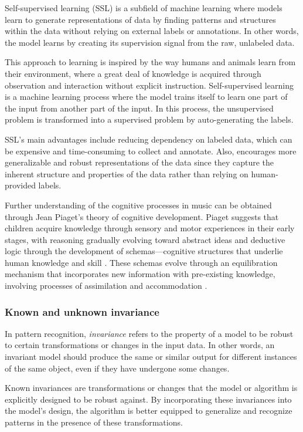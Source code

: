 Self-supervised learning (SSL) is a subfield of machine learning where models learn to generate representations of data by finding patterns and structures within the data without relying on external labels or annotations. In other words, the model learns by creating its supervision signal from the raw, unlabeled data.\cite{audioselfsupsurvey}

This approach to learning is inspired by the way humans and animals learn from their environment, where a great deal of knowledge is acquired through observation and interaction without explicit instruction. Self-supervised learning is a machine learning process where the model trains itself to learn one part of the input from another part of the input. In this process, the unsupervised problem is transformed into a supervised problem by auto-generating the labels.

SSL's main advantages include reducing dependency on labeled data, which can be expensive and time-consuming to collect and annotate. Also, encourages more generalizable and robust representations of the data since they capture the inherent structure and properties of the data rather than relying on human-provided labels.

Further understanding of the cognitive processes in music can be obtained through Jean Piaget's theory of cognitive development. Piaget suggests that children acquire knowledge through sensory and motor experiences in their early stages, with reasoning gradually evolving toward abstract ideas and deductive logic through the development of schemas—cognitive structures that underlie human knowledge and skill \cite{Huitt2003PiagetsDevelopment}. These schemas evolve through an equilibration mechanism that incorporates new information with pre-existing knowledge, involving processes of assimilation and accommodation \cite{audioselfsupsurvey}.

\subsubsection{Known and unknown invariance}

In pattern recognition, \textit{invariance} refers to the property of a model to be robust to certain transformations or changes in the input data. In other words, an invariant model should produce the same or similar output for different instances of the same object, even if they have undergone some changes.

\begin{definition}
Known invariances are transformations or changes that the model or algorithm is explicitly designed to be robust against. By incorporating these invariances into the model's design, the algorithm is better equipped to generalize and recognize patterns in the presence of these transformations.
\end{definition}

